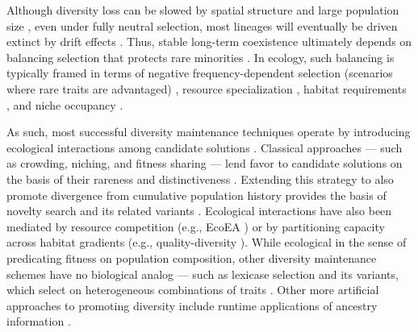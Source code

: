 Although diversity loss can be slowed by spatial structure and large population size \citep{slatkin1981fixation,kimura1969average}, even under fully neutral selection, most lineages will eventually be driven extinct by drift effects \citep{wright1931evolution,fisher1930genetical,kingman1982coalescent}.
Thus, stable long-term coexistence ultimately depends on balancing selection that protects rare minorities \citep{chesson2000mechanisms}.
In ecology, such balancing is typically framed in terms of negative frequency-dependent selection (scenarios where rare traits are advantaged) \citep{brisson2018negative,clarke1979evolution,wright1939distribution,levin1988frequency}, resource specialization \citep{tilman1980resources}, habitat requirements \citep{grinnell1917niche}, and niche occupancy \citep{hutchinson1957concluding}.

As such, most successful diversity maintenance techniques operate by introducing ecological interactions among candidate solutions \citep{dolson2018applying, dolson2018ecological}.
Classical approaches --- such as crowding, niching, and fitness sharing --- lend favor to candidate solutions on the basis of their rareness and distinctiveness \citep{mahfoud1996niching,petrowski1996clearing,dejong1975analysis,friedrich2009analysis}.
Extending this strategy to also promote divergence from cumulative population history provides the basis of novelty search and its related variants \citep{lehman2011abandoning,pugh2016quality,lehman2011evolving}.
Ecological interactions have also been mediated by resource competition (e.g., EcoEA \citep{goings2009ecological,goings2012ecologybased}) or by partitioning capacity across habitat gradients (e.g., quality-diversity \citep{mouret2015illuminating,cully2018quality}).
While ecological in the sense of predicating fitness on population composition, other diversity maintenance schemes have no biological analog --- such as lexicase selection and its variants, which select on heterogeneous combinations of traits \citep{spector2012assessment,ferguson2020characterizing,boldi2024informed,lacava2016epsilonlexicase}.
Other more artificial approaches to promoting diversity include runtime applications of ancestry information \citep{burlacu2019online,gabor2018inheritancebased,gabor2018preparing,burke2003increased,lalejini2024phylogenyinformed,lalejini2024runtime,murphy2008simple,burlacu2023population}.

